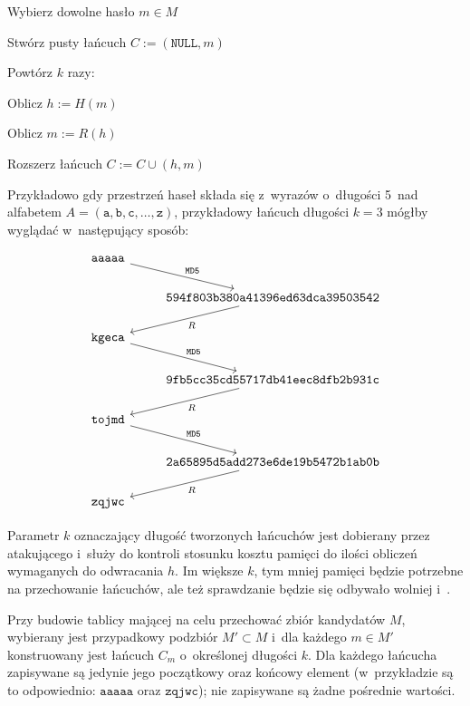 \begin{myenumerate}

    \item Wybierz dowolne hasło $m \in M$

    \item Stwórz pusty łańcuch $C := (\texttt{NULL}, m)$

    \item Powtórz $k$ razy:

    \begin{myenumerate}

        \item Oblicz $h := H(m)$

        \item Oblicz $m := R(h)$

        \item Rozszerz łańcuch $C := C \cup (h, m)$

    \end{myenumerate}

\end{myenumerate}

Przykładowo gdy przestrzeń haseł składa się z~wyrazów o~długości 5~nad
alfabetem $A = (\mathtt{a}, \mathtt{b}, \mathtt{c}, \ldots, \mathtt{z})$,
przykładowy łańcuch długości $k=3$ mógłby wyglądać w~następujący sposób:

\[
\begin{tikzcd}
    \mathtt{aaaaa} \arrow{rd}{\mathtt{MD5}} & \\
    & \arrow{ld}{R} \mathtt{594f803b380a41396ed63dca39503542} \\
    \mathtt{kgeca} \arrow{rd}{\mathtt{MD5}} & \\
    & \arrow{ld}{R} \mathtt{9fb5cc35cd55717db41eec8dfb2b931c} \\
    \mathtt{tojmd} \arrow{rd}{\mathtt{MD5}} & \\
    & \arrow{ld}{R} \mathtt{2a65895d5add273e6de19b5472b1ab0b} \\
    \mathtt{zqjwc}
\end{tikzcd}
\]

Parametr $k$ oznaczający długość tworzonych łańcuchów jest dobierany przez
atakującego i~służy do kontroli stosunku kosztu pamięci do ilości obliczeń
wymaganych do odwracania $h$. Im większe $k$, tym mniej pamięci będzie
potrzebne na przechowanie łańcuchów, ale też sprawdzanie będzie się odbywało
wolniej i~.

Przy budowie tablicy mającej na celu przechować zbiór kandydatów $M$, wybierany
jest przypadkowy podzbiór $M' \subset M$ i~dla każdego $m \in M'$ konstruowany
jest łańcuch $C_m$ o~określonej długości $k$. Dla każdego łańcucha zapisywane
są jedynie jego początkowy oraz końcowy element (w~przykładzie są to
odpowiednio: $\mathtt{aaaaa}$ oraz $\mathtt{zqjwc}$); nie zapisywane są żadne
pośrednie wartości.

